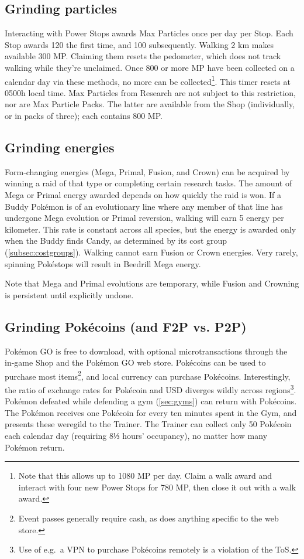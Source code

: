 \subsection{Grinding particles}
Interacting with Power Stops awards Max Particles once per day per Stop.
Each Stop awards 120 the first time, and 100 subsequently.
Walking 2 km makes available 300 MP\@.
Claiming them resets the pedometer, which does not track walking while they're unclaimed.
Once 800 or more MP have been collected on a calendar day via these methods, no
 more can be collected\footnote{Note that this allows up to 1080 MP per day.
 Claim a walk award and interact with four new Power Stops for 780 MP, then
 close it out with a walk award.}.
This timer resets at 0500h local time.
Max Particles from Research are not subject to this restriction, nor are Max Particle Packs.
The latter are available from the Shop (individually, or in packs of three); each contains 800 MP\@.

\subsection{Grinding energies}
Form-changing energies (Mega, Primal, Fusion, and Crown) can be acquired by
 winning a raid of that type or completing certain research tasks.
The amount of Mega or Primal energy awarded depends on how quickly the raid is won.
If a Buddy Pokémon is of an evolutionary line where any member of that line has undergone Mega evolution
  or Primal reversion, walking will earn 5 energy per kilometer.
This rate is constant across all species, but the energy is awarded only when the Buddy finds Candy,
  as determined by its cost group (\autoref{subsec:costgroups}).
Walking cannot earn Fusion or Crown energies.
Very rarely, spinning Pokéstops will result in Beedrill Mega energy.

Note that Mega and Primal evolutions are temporary, while Fusion and Crowning is persistent
  until explicitly undone.
\subsection{Grinding Pokécoins (and F2P vs. P2P)\label{subsec:getcoins}}
Pokémon GO is free to download, with optional microtransactions through the in-game
  Shop and the Pokémon GO web store.
Pokécoins can be used to purchase most items\footnote{Event passes generally require cash,
  as does anything specific to the web store.}, and local currency can purchase Pokécoins.
Interestingly, the ratio of exchange rates for Pokécoin and USD diverges
  wildly across regions\footnote{Use of e.g.\ a VPN to purchase Pokécoins remotely is a violation of the ToS\@.}.
Pokémon defeated while defending a gym (\autoref{sec:gyms}) can return with Pokécoins.
The Pokémon receives one Pokécoin for every ten minutes spent in the Gym, and presents these weregild to the Trainer.
The Trainer can collect only 50 Pokécoin each calendar day (requiring 8⅓ hours' occupancy), no matter how many Pokémon return.

